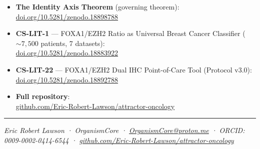 \documentclass[11pt, a4paper]{article}
\begin{document}
\begin{itemize}
    \item \textbf{The Identity Axis Theorem} (governing
    theorem):\\
    \href{https://doi.org/10.5281/zenodo.18898788}
    {doi.org/10.5281/zenodo.18898788}

    \item \textbf{CS-LIT-1} --- FOXA1/EZH2 Ratio as
    Universal Breast Cancer Classifier (${\sim}7{,}500$
    patients, 7 datasets):\\
    \href{https://doi.org/10.5281/zenodo.18883922}
    {doi.org/10.5281/zenodo.18883922}

    \item \textbf{CS-LIT-22} --- FOXA1/EZH2 Dual IHC
    Point-of-Care Tool (Protocol v3.0):\\
    \href{https://doi.org/10.5281/zenodo.18892788}
    {doi.org/10.5281/zenodo.18892788}

    \item \textbf{Full repository}:\\
    \href{https://github.com/Eric-Robert-Lawson/attractor-oncology}
    {github.com/Eric-Robert-Lawson/attractor-oncology}
\end{itemize}

\vspace{1em}
\noindent\rule{\textwidth}{0.4pt}

\noindent\footnotesize
\textit{Eric Robert Lawson · OrganismCore ·
\href{mailto:OrganismCore@proton.me}{OrganismCore@proton.me}
· ORCID: 0009-0002-0414-6544 ·
\href{https://github.com/Eric-Robert-Lawson/attractor-oncology}
{github.com/Eric-Robert-Lawson/attractor-oncology}}
\end{document}
